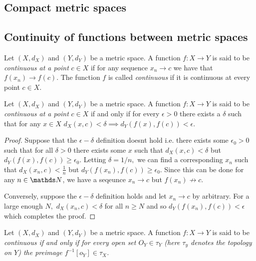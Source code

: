 \subsection{Compact metric spaces}

\subsection{Continuity of functions between metric spaces}
\begin{defn}
\label{def:continousFunction}Let $\left(X,d_{X}\right)$ and $\left(Y,d_{Y}\right)$
be a metric space. A function $f:X\to Y$ is said to be \emph{continuous
at a point} $c\in X$ if for any sequence $x_{n}\to c$ we have that
$f\left(x_{n}\right)\to f\left(c\right)$. The function $f$ is called
\emph{continuous }if it is continuous at every point $c\in X$.
\end{defn}

\begin{prop}
\label{prop:equivalentContinuity}Let $\left(X,d_{X}\right)$ and
$\left(Y,d_{Y}\right)$ be a metric space. A function $f:X\to Y$
is said to be \emph{continuous at a point} $c\in X$ if and only if
for every $\epsilon>0$ there exists a $\delta$ such that for any
$x\in X$ $d_{X}\left(x,c\right)<\delta\implies d_{Y}\left(f\left(x\right),f\left(c\right)\right)<\epsilon$.
\end{prop}

\begin{proof}
Suppose that the $\epsilon-\delta$ definition doesnt hold i.e. there
exists some $\epsilon_{0}>0$ such that for all $\delta>0$ there
exists some $x$ such that $d_{X}\left(x,c\right)<\delta$ but $d_{Y}\left(f\left(x\right),f\left(c\right)\right)\geq\epsilon_{0}.$
Letting $\delta=1/n,$ we can find a corresponding $x_{n}$ such that
$d_{X}\left(x_{n},c\right)<\frac{1}{n}$ but $d_{Y}\left(f\left(x_{n}\right),f\left(c\right)\right)\geq\epsilon_{0}$.
Since this can be done for any $n\in\N$, we have a seqeunce $x_{n}\to c$
but $f\left(x_{n}\right)\not\to c$.

Conversely, suppose the $\epsilon-\delta$ definition holds and let
$x_{n}\to c$ by arbitrary. For a large enough $N,$ $d_{X}\left(x_{n},c\right)<\delta$
for all $n\geq N$ and so $d_{Y}\left(f\left(x_{n}\right),f\left(c\right)\right)<\epsilon$
which completes the proof.
\end{proof}
\begin{prop}
\label{prop:openPreImageMetric}Let $\left(X,d_{X}\right)$ and $\left(Y,d_{Y}\right)$
be a metric space. A function $f:X\to Y$ is said to be \emph{continuous
if and only if for every open set $O_{Y}\in\tau_{Y}$ (here $\tau_{y}$
denotes the topology on $Y$) the preimage $f^{-1}\left[o_{Y}\right]\in\tau_{X}$.}
\end{prop}

